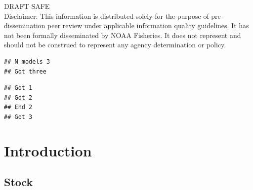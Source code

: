 \documentclass[12pt,]{article}
\begin{document}
\begin{center}
\vspace{.5cm}

\vfill
DRAFT SAFE\\
Disclaimer: This information is distributed solely for the purpose of pre-dissemination
peer review under applicable information quality guidelines. It has not been formally
disseminated by NOAA Fisheries. It does not represent and should not be construed to
represent any agency determination or policy. 

\vspace{.3cm}


\newpage{\thispagestyle{empty}}


% 

\maketitle

\setcounter{page}{1}
\end{center}

{
\setcounter{tocdepth}{4}
\tableofcontents
}
\begin{verbatim}
## N models 3 
## Got three
\end{verbatim}

\begin{verbatim}
## Got 1
## Got 2
## End 2
## Got 3
\end{verbatim}

\setlength{\parskip}{5mm plus1mm minus1mm} \pagebreak

\setcounter{page}{1} \renewcommand{\thefigure}{\alph{figure}}
\renewcommand{\thetable}{\alph{table}}

\section*{Introduction}\label{introduction}

\subsection*{Stock}\label{stock}
\end{document}
